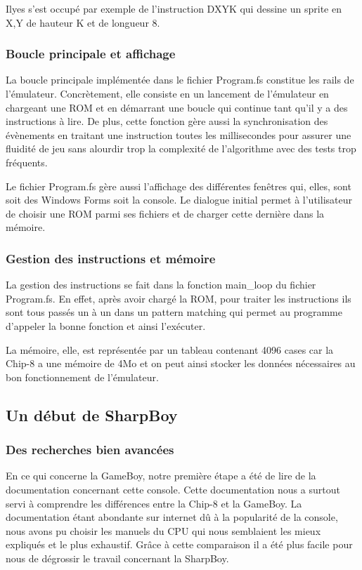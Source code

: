\documentclass[12pt, a4paper]{article}
\begin{document}
Ilyes s'est occupé par exemple de l'instruction DXYK qui dessine un sprite en X,Y de hauteur K et de longueur 8. 

\pagebreak

\subsubsection{\large Boucle principale et affichage}
La boucle principale implémentée dans le fichier Program.fs constitue les rails de l'émulateur. Concrètement,
elle consiste en un lancement de l'émulateur en chargeant une ROM et en démarrant une boucle qui continue tant qu'il y a des instructions à lire. De plus, cette fonction gère aussi la synchronisation des évènements en traitant une instruction toutes les millisecondes pour assurer une fluidité de jeu sans alourdir trop la complexité de l'algorithme avec des tests trop fréquents.

Le fichier Program.fs gère aussi l'affichage des différentes fenêtres qui, elles, sont soit des Windows Forms soit la console. Le dialogue initial permet à l'utilisateur de choisir une ROM parmi ses fichiers et de charger cette dernière dans la mémoire. 

\bigskip
\subsubsection{\large Gestion des instructions et mémoire}
La gestion des instructions se fait dans la fonction main\_loop du fichier Program.fs. En effet, après avoir chargé la ROM, pour traiter les instructions ils sont tous passés un à un dans un pattern matching qui permet au programme d'appeler la bonne fonction et ainsi l'exécuter.

La mémoire, elle, est représentée par un tableau contenant 4096 cases car la Chip-8 a une mémoire de 4Mo et on peut ainsi stocker les données nécessaires au bon fonctionnement de l'émulateur.
\pagebreak
\subsection {Un début de SharpBoy}

\subsubsection{\large Des recherches bien avancées}
En ce qui concerne la GameBoy, notre première étape a été de lire de la documentation concernant cette console. Cette documentation nous a surtout servi à comprendre les différences entre la Chip-8 et la GameBoy. La documentation étant abondante sur internet dû à la popularité de la console, nous avons pu choisir les manuels du CPU qui nous semblaient les mieux expliqués et le plus exhaustif. Grâce à cette comparaison il a été plus facile pour nous de dégrossir le travail concernant la SharpBoy. 
\end{document}
